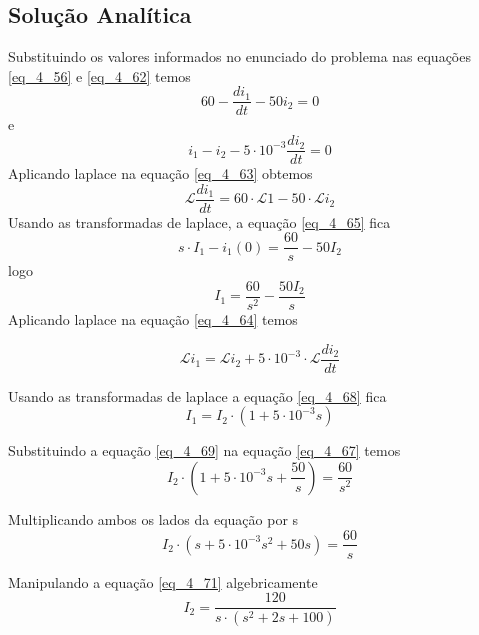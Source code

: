 \documentclass[12pt]{article}
\begin{document}
\subsection{Solução Analítica}
Substituindo os valores informados no enunciado do problema nas equações \ref{eq_4_56} e \ref{eq_4_62} temos
\begin{equation}
    60 - \frac{di_1}{dt} - 50i_2 = 0
\label{eq_4_63}
\end{equation}
e
\begin{equation}
   i_1-i_2 - 5 \cdot 10^{-3}\frac{di_2}{dt} = 0
\label{eq_4_64}
\end{equation}
Aplicando laplace na equação \ref{eq_4_63} obtemos
\begin{equation}
   \mathcal{L}{\frac{di_1}{dt}} = 60 \cdot \mathcal{L}{1}-50\cdot \mathcal{L}{i_2}
\label{eq_4_65}
\end{equation}
Usando as transformadas de laplace, a equação \ref{eq_4_65} fica 
\begin{equation}
  s\cdot I_1-i_1(0)=\frac{60}{s}-50I_2
\label{eq_4_66}
\end{equation}
logo
\begin{equation}
   I_1 = \frac{60}{s^2}-\frac{50I_2}{s} 
\label{eq_4_67}
\end{equation}
Aplicando laplace na equação \ref{eq_4_64} temos

\begin{equation}
  \mathcal{L}{i_1} = \mathcal{L}{i_2} + 5 \cdot 10^{-3} \cdot \mathcal{L}{\frac{di_2}{dt}}
\label{eq_4_68}
\end{equation}

Usando as transformadas de laplace a equação \ref{eq_4_68} fica
\begin{equation}
  I_1 = I_2 \cdot (1+5\cdot 10^{-3}s)
\label{eq_4_69}
\end{equation}

Substituindo a equação \ref{eq_4_69} na equação \ref{eq_4_67} temos
\begin{equation}
  I_2 \cdot (1 + 5 \cdot 10^{-3}s + \frac{50}{s}) = \frac{60}{s^2}
\label{eq_4_70}
\end{equation}

Multiplicando ambos os lados da equação por s
\begin{equation}
    I_2 \cdot (s + 5 \cdot 10^{-3}s^2 + 50s) = \frac{60}{s}
\label{eq_4_71}
\end{equation}


Manipulando a equação \ref{eq_4_71} algebricamente
\begin{equation}
  I_2 = \frac{120}{s\cdot(s^2+2s+100)}
\label{eq_4_72}
\end{equation}
\end{document}
